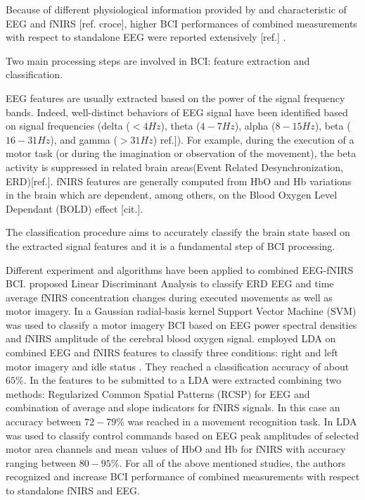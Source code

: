 \documentclass[12pt ]{iopart}
\begin{document}
Because of different physiological information provided by and characteristic of EEG and fNIRS [ref. croce], higher BCI performances  of combined measurements with respect to standalone EEG were reported extensively [ref.] .

Two main processing steps are involved in BCI:  feature extraction and classification. 

EEG features are usually extracted based on the power of the signal frequency bands. Indeed, well-distinct behaviors of EEG signal have been identified based on signal frequencies (delta ($< 4 Hz$), theta ($4-7 Hz$), alpha ($8-15 Hz$), beta ($16-31 Hz$), and gamma ($> 31 Hz$) ref.]). For example, during the execution of a motor task (or during the imagination or observation of the movement), the beta activity is suppressed in related brain areas(Event Related Desynchronization, ERD)[ref.].  
fNIRS  features are generally  computed from  HbO and Hb variations in the brain which are dependent, among others, on the  Blood Oxygen Level Dependant (BOLD) effect [cit.]. 

The classification procedure aims to accurately classify the brain state  based on the extracted signal features  and it is a fundamental step of BCI processing.


Different  experiment and algorithms have been applied  to combined EEG-fNIRS BCI. \textcite{Fazli_2012} proposed Linear Discriminant Analysis to classify ERD EEG and time average fNIRS concentration changes during executed movements as well as motor imagery.  In \textcite{ma2012hybrid} a Gaussian radial-basis kernel Support Vector Machine (SVM) was used to classify a motor imagery BCI based on EEG power spectral densities and fNIRS amplitude of the cerebral blood oxygen signal.   \textcite{lee2014hybrid} employed LDA on combined EEG and fNIRS features to classify three conditions: right and left motor imagery and idle status . They reached a classification accuracy of about $65\%$. In \textcite{buccino2016hybrid} the features to be submitted to a LDA were extracted combining two methods: Regularized Common Spatial Patterns (RCSP) for EEG and combination of average and slope indicators for fNIRS signals. In this case an accuracy between $72-79\%$ was reached in a movement recognition task. In  \textcite{khan2014decoding, khan2017hybrid} LDA was used to classify control commands based on EEG peak amplitudes of selected motor area channels and mean values of HbO and Hb for fNIRS with accuracy ranging between $80-95\%$.
For all of the above mentioned studies, the authors recognized and increase BCI performance of combined measurements with respect to standalone fNIRS and EEG.
\end{document}

